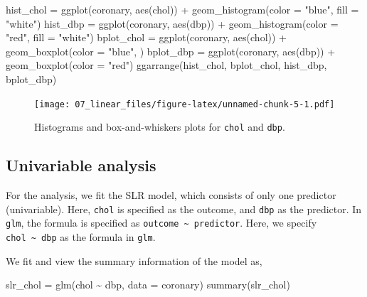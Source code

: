 \documentclass[
  10pt,
]{krantz}
\newenvironment{Shaded}{\begin{snugshade}}{\end{snugshade}}
\newcommand{\AttributeTok}[1]{\textcolor[rgb]{0.77,0.63,0.00}{#1}}
\newcommand{\FunctionTok}[1]{\textcolor[rgb]{0.00,0.00,0.00}{#1}}
\newcommand{\NormalTok}[1]{#1}
\newcommand{\OtherTok}[1]{\textcolor[rgb]{0.56,0.35,0.01}{#1}}
\newcommand{\SpecialCharTok}[1]{\textcolor[rgb]{0.00,0.00,0.00}{#1}}
\newcommand{\StringTok}[1]{\textcolor[rgb]{0.31,0.60,0.02}{#1}}
\begin{document}
\begin{Shaded}
\begin{Highlighting}[]
\NormalTok{hist\_chol }\OtherTok{=} \FunctionTok{ggplot}\NormalTok{(coronary, }\FunctionTok{aes}\NormalTok{(chol)) }\SpecialCharTok{+} 
  \FunctionTok{geom\_histogram}\NormalTok{(}\AttributeTok{color =} \StringTok{"blue"}\NormalTok{, }\AttributeTok{fill =} \StringTok{"white"}\NormalTok{)}
\NormalTok{hist\_dbp }\OtherTok{=} \FunctionTok{ggplot}\NormalTok{(coronary, }\FunctionTok{aes}\NormalTok{(dbp)) }\SpecialCharTok{+} 
  \FunctionTok{geom\_histogram}\NormalTok{(}\AttributeTok{color =} \StringTok{"red"}\NormalTok{, }\AttributeTok{fill =} \StringTok{"white"}\NormalTok{)}
\NormalTok{bplot\_chol }\OtherTok{=} \FunctionTok{ggplot}\NormalTok{(coronary, }\FunctionTok{aes}\NormalTok{(chol)) }\SpecialCharTok{+} 
  \FunctionTok{geom\_boxplot}\NormalTok{(}\AttributeTok{color =} \StringTok{"blue"}\NormalTok{, )}
\NormalTok{bplot\_dbp }\OtherTok{=} \FunctionTok{ggplot}\NormalTok{(coronary, }\FunctionTok{aes}\NormalTok{(dbp)) }\SpecialCharTok{+} 
  \FunctionTok{geom\_boxplot}\NormalTok{(}\AttributeTok{color =} \StringTok{"red"}\NormalTok{)}
\FunctionTok{ggarrange}\NormalTok{(hist\_chol, bplot\_chol, hist\_dbp, bplot\_dbp)}
\end{Highlighting}
\end{Shaded}

\begin{figure}
\centering
\texttt{[image: 07\_linear\_files/figure-latex/unnamed-chunk-5-1.pdf]}
\caption{\label{fig:unnamed-chunk-5}Histograms and box-and-whiskers plots for \texttt{chol} and \texttt{dbp}.}
\end{figure}

\hypertarget{univariable-analysis}{%
\subsection{Univariable analysis}\label{univariable-analysis}}

For the analysis, we fit the SLR model, which consists of only one predictor (univariable). Here, \texttt{chol} is specified as the outcome, and \texttt{dbp} as the predictor. In \texttt{glm}, the formula is specified as \texttt{outcome\ \textasciitilde{}\ predictor}. Here, we specify \texttt{chol\ \textasciitilde{}\ dbp} as the formula in \texttt{glm}.

We fit and view the summary information of the model as,

\begin{Shaded}
\begin{Highlighting}[]
\NormalTok{slr\_chol }\OtherTok{=} \FunctionTok{glm}\NormalTok{(chol }\SpecialCharTok{\textasciitilde{}}\NormalTok{ dbp, }\AttributeTok{data =}\NormalTok{ coronary)}
\FunctionTok{summary}\NormalTok{(slr\_chol)}
\end{Highlighting}
\end{Shaded}
\end{document}
